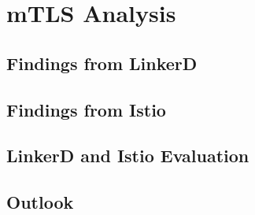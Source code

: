 %
%

\pagebreak
\section{mTLS Analysis}

\onehalfspacing

\subsection{Findings from LinkerD}

\subsection{Findings from Istio}

\subsection{LinkerD and Istio Evaluation}

\subsection{Outlook}
